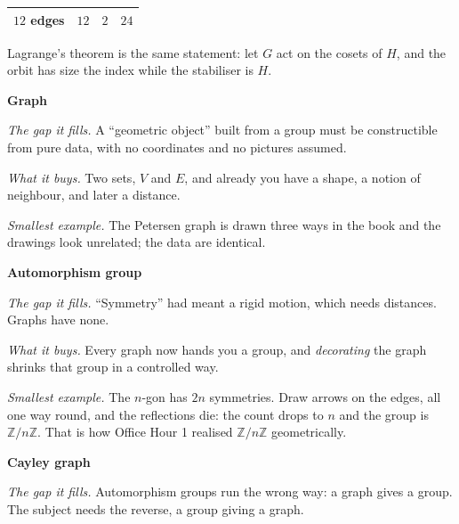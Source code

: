 \documentclass[10pt]{article}
\newcommand{\Z}{\mathbb{Z}}
\begin{document}
{\begin{minipage}[t]{744pt}
\begin{minipage}[t]{238pt}
\begin{center}
\begin{tabular}{@{}lccc@{}}
$12$ edges & $12$ & $2$ & $24$\\
\bottomrule
\end{tabular}
\end{center}
\vspace{1pt}
Lagrange's theorem is the same statement: let $G$ act on the cosets of $H$, and the orbit has size the index while the stabiliser is $H$.\par\vspace{5pt}
{\sffamily\bfseries\color{big} Graph}\par\vspace{1pt}
\emph{The gap it fills.} A ``geometric object'' built from a group must be constructible from pure data, with no coordinates and no pictures assumed.\par\vspace{1pt}
\emph{What it buys.} Two sets, $V$ and $E$, and already you have a shape, a notion of neighbour, and later a distance.\par\vspace{1pt}
\emph{Smallest example.} The Petersen graph is drawn three ways in the book and the drawings look unrelated; the data are identical.
\end{minipage}\hfill
\begin{minipage}[t]{238pt}\vspace{0pt}
{\sffamily\bfseries\color{big} Automorphism group}\par\vspace{1pt}
\emph{The gap it fills.} ``Symmetry'' had meant a rigid motion, which needs distances. Graphs have none.\par\vspace{1pt}
\emph{What it buys.} Every graph now hands you a group, and \emph{decorating} the graph shrinks that group in a controlled way.\par\vspace{1pt}
\emph{Smallest example.} The $n$-gon has $2n$ symmetries. Draw arrows on the edges, all one way round, and the reflections die: the count drops to $n$ and the group is $\Z/n\Z$. That is how Office Hour 1 realised $\Z/n\Z$ geometrically.\par\vspace{5pt}
{\sffamily\bfseries\color{big} Cayley graph}\par\vspace{1pt}
\emph{The gap it fills.} Automorphism groups run the wrong way: a graph gives a group. The subject needs the reverse, a group giving a graph.\par\vspace{1pt}

\end{minipage}
\end{minipage}}
\end{document}

